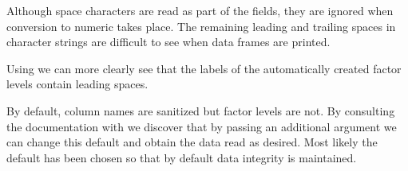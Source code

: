 \documentclass[krantz2]{krantz}\usepackage{knitr}
\begin{document}
Although space characters are read as part of the fields, they are ignored when conversion to numeric takes place. The remaining leading and trailing spaces in character strings are difficult to see when data frames are printed.
\begin{knitrout}\footnotesize
{}\color{fgcolor}\begin{kframe}
\begin{alltt}
 \hlkwb{<-} \hlstd{(}\hlstd{)}
\end{alltt}


{\ttfamily\noindent{}}

{\ttfamily\noindent\bfseries{}}\end{kframe}
\end{knitrout}

Using  we can more clearly see that the labels of the automatically created factor levels contain leading spaces.
\begin{knitrout}\footnotesize
{}\color{fgcolor}\begin{kframe}
\begin{alltt}
\end{alltt}


{\ttfamily\noindent\bfseries\color{errorcolor}{\#\# Error in lapply(X = X, FUN = FUN, ...): object 'from\_csv\_b.df' not found}}\begin{alltt}
\hlstd{from_csv_b.df[[}\hlstd{]]}
\end{alltt}


{\ttfamily\noindent\bfseries\color{errorcolor}{\#\# Error in eval(expr, envir, enclos): object 'from\_csv\_b.df' not found}}\begin{alltt}
\hlstd{(from_csv_b.df[[}\hlstd{]])}
\end{alltt}


{\ttfamily\noindent\bfseries\color{errorcolor}{\#\# Error in levels(from\_csv\_b.df[["{}col4"{}]]): object 'from\_csv\_b.df' not found}}\end{kframe}
\end{knitrout}

By default, column names are sanitized but factor levels are not. By consulting the documentation with  we discover that by passing an additional argument we can change this default and obtain the data read as desired. Most likely the default has been chosen so that by default data integrity is maintained.
\end{document}
